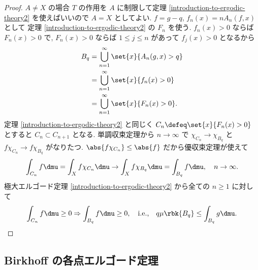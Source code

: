 \documentclass[openany, a4paper, oneside]{jsbook}
\begin{document}
\begin{proof}
$A \neq X$ の場合 $T$ の作用を $A$ に制限して定理
\ref{introduction-to-ergodic-theory2} を使えばいいので $A=X$ としてよい.
$f = g - q$, $f_n (x) = n A_n(f, x)$ として
定理 \ref{introduction-to-ergodic-theory2} の $F_n$ を使う.
$f_n (x) > 0$ ならば $F_n (x) >0$ で, $F_n (x) > 0$ ならば $1 \leq j \leq n$ があって $f_j (x) > 0$ となるから
\begin{align}
 B_{q}
 &=
 \bigcup_{n=1}^{\infty} \set{x}{A_n(g, x) > q} \\
 &=
 \bigcup_{n=1}^{\infty} \set{x}{f_n(x) > 0} \\
 &=
 \bigcup_{n=1}^{\infty} \set{x}{F_n(x) > 0}.
\end{align}
定理 \ref{introduction-to-ergodic-theory2} と同じく
$C_n \defeq \set{x}{F_n (x) > 0}$ とすると $C_n \subset C_{n+1}$ となる.
単調収束定理から $n \to \infty$ で $\chi_{C_n} \to \chi_{B_q}$ と $f \chi_{C_n} \to f \chi_{B_q}$ がなりたつ.
$\abs{f \chi_{C_n}} \leq \abs{f}$ だから優収束定理が使えて
\begin{align}
 \int_{C_n} f \dmu
 =
 \int_{X} f \chi_{C_n} \dmu
 \to
 \int_{X} f \chi_{B_q} \dmu
 =
 \int_{B_q} f \dmu, \quad n \to \infty.
\end{align}
極大エルゴード定理 \ref{introduction-to-ergodic-theory2} から全ての $n \geq 1$ に対して
\begin{align}
 \int_{C_n} f \dmu \geq 0
 \Rightarrow
 \int_{B_q} f \dmu \geq 0, \quad \text{i.e.,} \quad
 q \mu \rbk{B_q}
 \leq
 \int_{B_q} g \dmu.
\end{align}
\end{proof}
\subsection{Birkhoff の各点エルゴード定理}
\end{document}
